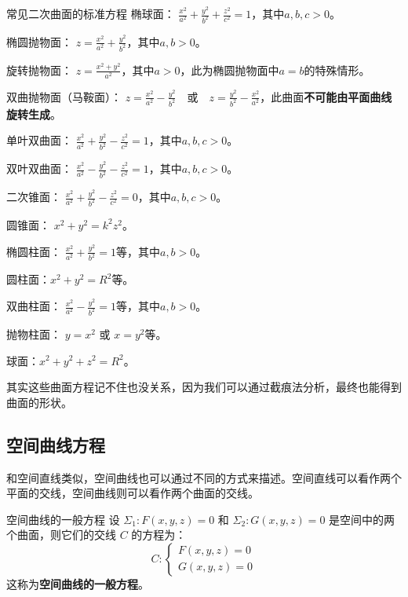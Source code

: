 \begin{definition}{常见二次曲面的标准方程}{}
  椭球面：
  \(
  \frac{x^2}{a^2} + \frac{y^2}{b^2} + \frac{z^2}{c^2} = 1
  \)，其中$a,b,c > 0$。

  椭圆抛物面：
\(
z = \frac{x^2}{a^2} + \frac{y^2}{b^2}
\)，其中$a,b > 0$。

旋转抛物面：
\(z = \frac{x^2+y^2}{a^2}\)，其中$a > 0$，此为椭圆抛物面中$a=b$的特殊情形。

双曲抛物面（马鞍面）：
\(
z = \frac{x^2}{a^2} - \frac{y^2}{b^2} \quad \text{或} \quad z = \frac{y^2}{b^2} - \frac{x^2}{a^2}
\)，此曲面\textbf{不可能由平面曲线旋转生成}。

单叶双曲面：
\(
\frac{x^2}{a^2} + \frac{y^2}{b^2} - \frac{z^2}{c^2} = 1
\)，其中$a,b,c > 0$。

双叶双曲面：
\(
\frac{x^2}{a^2} - \frac{y^2}{b^2} - \frac{z^2}{c^2} = 1
\)，其中$a,b,c > 0$。

二次锥面：
\(
\frac{x^2}{a^2} + \frac{y^2}{b^2} - \frac{z^2}{c^2} = 0
\)，其中$a,b,c > 0$。

圆锥面： \(x^2+y^2 = k^2z^2\)。

椭圆柱面： \(\frac{x^2}{a^2} + \frac{y^2}{b^2} = 1\)等，其中$a,b > 0$。

圆柱面：\(x^2+y^2=R^2\)等。

双曲柱面： \(\frac{x^2}{a^2} - \frac{y^2}{b^2} = 1\)等，其中$a,b > 0$。

抛物柱面： \(y = x^2\) 或 \(x = y^2\)等。

球面：\(x^2+y^2+z^2=R^2\)。
\end{definition}

其实这些曲面方程记不住也没关系，因为我们可以通过截痕法分析，最终也能得到曲面的形状。

\subsection{空间曲线方程}

和空间直线类似，空间曲线也可以通过不同的方式来描述。空间直线可以看作两个平面的交线，空间曲线则可以看作两个曲面的交线。

\begin{definition}{空间曲线的一般方程}{}
设 $\Sigma_1: F(x,y,z)=0$ 和 $\Sigma_2: G(x,y,z)=0$ 是空间中的两个曲面，则它们的交线 $C$ 的方程为：
\[
C: \begin{cases}
F(x,y,z)=0 \\
G(x,y,z)=0
\end{cases}
\]
这称为\textbf{空间曲线的一般方程}。
\end{definition}

